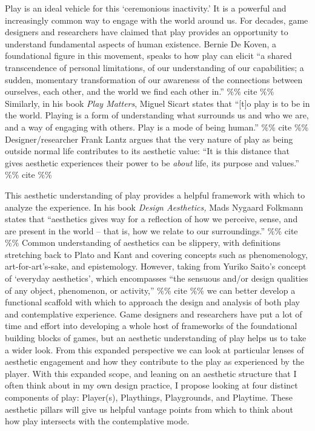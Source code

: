\documentclass[
]{article}
\begin{document}
Play is an ideal vehicle for this `ceremonious inactivity.' It is a
powerful and increasingly common way to engage with the world around us.
For decades, game designers and researchers have claimed that play
provides an opportunity to understand fundamental aspects of human
existence. Bernie De Koven, a foundational figure in this movement,
speaks to how play can elicit ``a shared transcendence of personal
limitations, of our understanding of our capabilities; a sudden,
momentary transformation of our awareness of the connections between
ourselves, each other, and the world we find each other in.'' \%\% cite
\%\% Similarly, in his book \emph{Play Matters}, Miguel Sicart states
that ``{[}t{]}o play is to be in the world. Playing is a form of
understanding what surrounds us and who we are, and a way of engaging
with others. Play is a mode of being human.'' \%\% cite \%\%
Designer/researcher Frank Lantz argues that the very nature of play as
being outside normal life contributes to its aesthetic value: ``It is
this distance that gives aesthetic experiences their power to be
\emph{about} life, its purpose and values.'' \%\% cite \%\%

This aesthetic understanding of play provides a helpful framework with
which to analyze the experience. In his book \emph{Design Aesthetics,}
Mads Nygaard Folkmann states that ``aesthetics gives way for a
reflection of how we perceive, sense, and are present in the world --
that is, how we relate to our surroundings.'' \%\% cite \%\% Common
understanding of aesthetics can be slippery, with definitions stretching
back to Plato and Kant and covering concepts such as phenomenology,
art-for-art's-sake, and epistemology. However, taking from Yuriko
Saito's concept of `everyday aesthetics', which encompasses ``the
sensuous and/or design qualities of any object, phenomenon, or
activity,'' \%\% cite \%\% we can better develop a functional scaffold
with which to approach the design and analysis of both play and
contemplative experience. Game designers and researchers have put a lot
of time and effort into developing a whole host of frameworks of the
foundational building blocks of games, but an aesthetic understanding of
play helps us to take a wider look. From this expanded perspective we
can look at particular lenses of aesthetic engagement and how they
contribute to the play as experienced by the player. With this expanded
scope, and leaning on an aesthetic structure that I often think about in
my own design practice, I propose looking at four distinct components of
play: Player(s), Playthings, Playgrounds, and Playtime. These aesthetic
pillars will give us helpful vantage points from which to think about
how play intersects with the contemplative mode.
\end{document}

